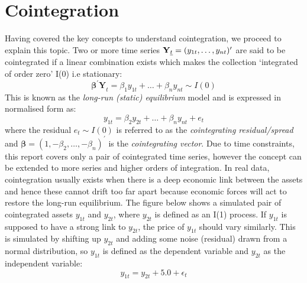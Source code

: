 \documentclass[11pt]{article}
\begin{document}
    \section{Cointegration}\label{cointegration}
    Having covered the key concepts to understand cointegration, we proceed
to explain this topic.
Two or more time series $\mathbf{Y}_{\emph{t}} = (y_{1t}, \dots,
y_{nt})^{\prime} $ are said to be cointegrated if a linear
combination exists which makes the collection `integrated of order
zero' I(0) i.e stationary:
\begin{equation}
\mathbf{\beta^\prime Y}_t = \beta_1 y_{1t} + \dots + \beta_n y_{nt} \sim I(0)
\end{equation}
This is known as the \emph{long-run (static) equilibrium} model and is
expressed in normalised form as:
\begin{equation}
y_{1t} = \beta_2 y_{2t} + \dots + \beta_n y_{nt} + e_t
\end{equation}
where the residual \(e_t \sim I(0)\) is referred to as the
\emph{cointegrating residual/spread} and
\(\mathbf{\beta} = (1, -\beta_2, \dots, -\beta_n)^\prime\) is the
\emph{cointegrating vector}.
Due to time constraints, this report covers only a pair of
cointegrated time series, however the concept can be extended to more
series and higher orders of integration.
In real data, cointegration usually exists when there is a deep
economic link between the assets and hence these cannot drift too far
apart because economic forces will act to restore the long-run
equilibrium. The figure below shows a simulated pair of cointegrated
assets \(y_{1t}\) and \(y_{2t}\), where \(y_{2t}\) is defined as an I(1)
process. If \(y_{1t}\) is supposed to have a strong link to \(y_{2t}\),
the price of \(y_{1t}\) should vary similarly. This is simulated by
shifting up \(y_{2t}\) and adding some noise (residual) drawn from a
normal distribution, so \(y_{1t}\) is defined as the dependent variable
and \(y_{2t}\) as the independent variable:
\begin{equation}
y_{1t} = y_{2t} + 5.0 + \epsilon_t
\end{equation}
    \begin{center}
    \end{center}
    { \hspace*{\fill} \\}
\end{document}
